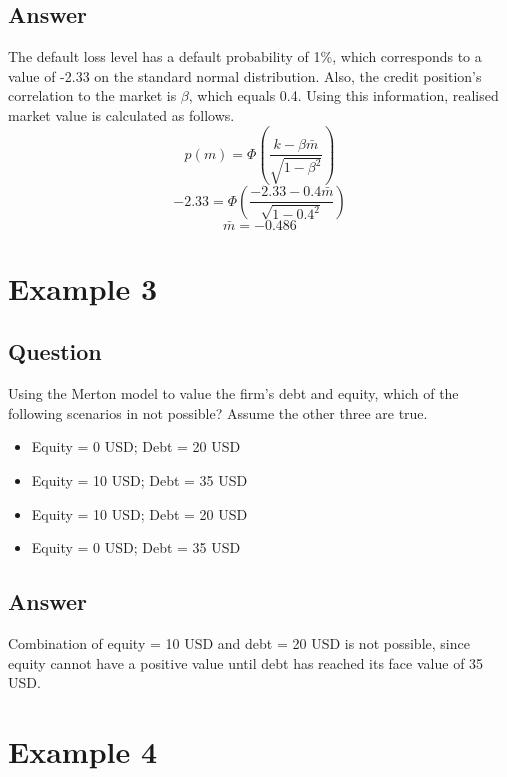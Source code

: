 \subsection{Answer}
The default loss level has a default probability of 1\%, which corresponds to a value of -2.33 on the standard normal distribution. Also, the credit position's correlation to the market is $\beta$, which equals 0.4. Using this information, realised market value is calculated as follows.
\begin{equation*}
p(m) = \Phi\left(\frac{k - \beta \bar{m}}{\sqrt{1 - \beta^2}} \right)
\end{equation*}
\begin{equation*}
-2.33 = \Phi\left(\frac{-2.33 - 0.4 \bar{m}}{\sqrt{1 - 0.4^2}}\right)
\end{equation*}
\begin{equation*}
\bar{m} = -0.486
\end{equation*}

\section{Example 3}

\subsection{Question}
Using the Merton model to value the firm's debt and equity, which of the following scenarios in not possible? Assume the other three are true.
\begin{itemize}
\item Equity = 0 USD; Debt = 20 USD
\item Equity = 10 USD; Debt = 35 USD
\item Equity = 10 USD; Debt = 20 USD
\item Equity = 0 USD; Debt = 35 USD
\end{itemize}

\subsection{Answer}
Combination of equity = 10 USD and debt = 20 USD is not possible, since equity cannot have a positive value until debt has reached its face value of 35 USD.

\section{Example 4}

